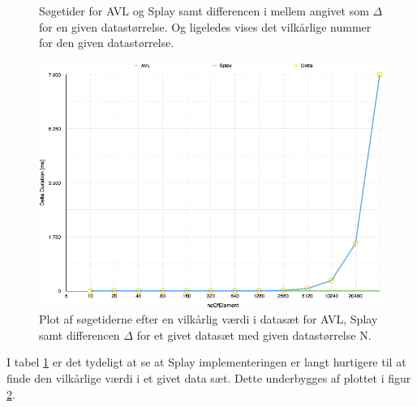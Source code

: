 \begin{figure}[th!]
\centering
{}
\captionsetup{type=table}
\caption{Søgetider for AVL og Splay samt differencen i mellem angivet som \(\Delta\) for en given datastørrelse. Og ligeledes vises det vilkårlige nummer for den given datastørrelse.}
\label{tb:find_key}
\end{figure}

\begin{figure}[th!]
\centering
\includegraphics[width=.8\textwidth]{./graphics/findkey}
\caption{Plot af søgetiderne efter en vilkårlig værdi i datasæt for AVL, Splay samt differencen \(\Delta\) for et givet datasæt med given datastørrelse N.}
\label{fig:find_key}
\end{figure}
I tabel \ref{tb:find_key} er det tydeligt at se at Splay implementeringen er langt hurtigere til at finde den vilkårlige værdi i et givet data sæt. Dette underbygges af plottet i figur \ref{fig:find_key}.


